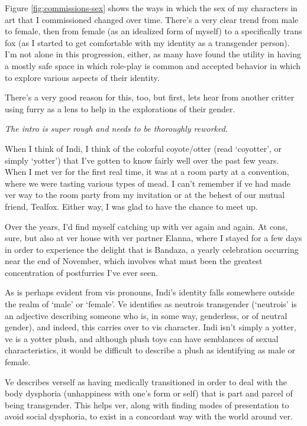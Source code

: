 Figure \ref{fig:commissions-sex} shows the ways in which the sex of my characters in art that I commissioned changed over time.  There's a very clear trend from male to female, then from female (as an idealized form of myself) to a specifically trans fox (as I started to get comfortable with my identity as a transgender person).  I'm not alone in this progression, either, as many have found the utility in having a mostly safe space in which role-play is common and accepted behavior in which to explore various aspects of their identity.

There's a very good reason for this, too, but first, lets hear from another critter using furry as a lens to help in the explorations of their gender.

\secdiv

\begin{center}
  \textit{The intro is super rough and needs to be thoroughly reworked.}
\end{center}

When I think of Indi, I think of the colorful coyote/otter (read `coyotter', or simply `yotter') that I've gotten to know fairly well over the past few years.  When I met ver for the first real time, it was at a room party at a convention, where we were tasting various types of mead.  I can't remember if ve had made ver way to the room party from my invitation or at the behest of our mutual friend, Tealfox.  Either way, I was glad to have the chance to meet up.

Over the years, I'd find myself catching up with ver again and again.  At cons, sure, but also at ver house with ver partner Elanna, where I stayed for a few days in order to experience the delight that is Bandaza, a yearly celebration occurring near the end of November, which involves what must been the greatest concentration of postfurries I've ever seen.

As is perhaps evident from vis pronouns, Indi's identity falls somewhere outside the realm of `male' or `female'.  Ve identifies as neutrois transgender (`neutrois' is an adjective describing someone who is, in some way, genderless, or of neutral gender), and indeed, this carries over to vis character.  Indi isn't simply a yotter, ve is a yotter plush, and although plush toys can have semblances of sexual characteristics, it would be difficult to describe a plush as identifying as male or female.

Ve describes verself as having medically transitioned in order to deal with the body dysphoria (unhappiness with one's form or self) that is part and parcel of being transgender.  This helps ver, along with finding modes of presentation to avoid social dysphoria, to exist in a concordant way with the world around ver.

